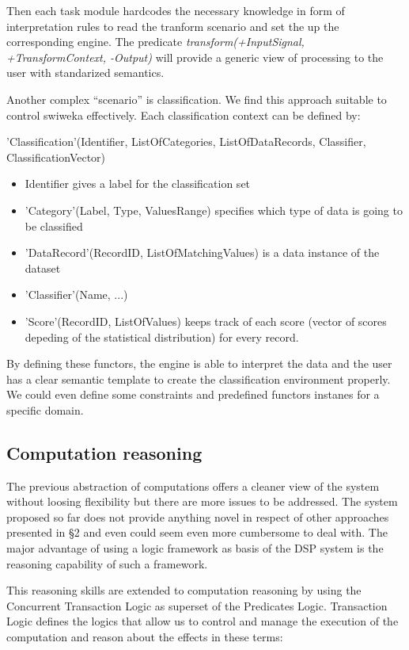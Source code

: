 \documentclass[runningheads]{llncs}
\begin{document}
Then each task module hardcodes the necessary knowledge in form of interpretation rules to read the tranform scenario and set the up the corresponding engine. The predicate \textit{transform(+InputSignal, +TransformContext, -Output)} will provide a generic view of processing to the user with standarized semantics.

Another complex ``scenario'' is classification. We find this approach suitable to control swiweka effectively. Each classification context can be defined by:

'Classification'(Identifier, ListOfCategories, ListOfDataRecords, Classifier, ClassificationVector)

\begin{itemize}

 \item Identifier gives a label for the classification set
 \item 'Category'(Label, Type, ValuesRange) specifies which type of data is going to be classified
 \item 'DataRecord'(RecordID, ListOfMatchingValues) is a data instance of the dataset 
 \item 'Classifier'(Name, ...)
 \item 'Score'(RecordID, ListOfValues) keeps track of each score (vector of scores depeding of the statistical distribution) for every record.
\end{itemize}

By defining these functors, the engine is able to interpret the data and the user has a clear semantic template to create the classification environment properly. We could even define some constraints and predefined functors instanes for a specific domain.

\subsection{Computation reasoning}\label{subsec:ctl}

The previous abstraction of computations offers a cleaner view of the system without loosing flexibility but there are more issues to be addressed. The system proposed so far does not provide anything novel in respect of other approaches presented in \S 2 and even could seem even more cumbersome to deal with. The major advantage of using a logic framework as basis of the DSP system is the reasoning capability of such a framework. 

This reasoning skills are extended to computation reasoning by using the Concurrent Transaction Logic as superset of the Predicates Logic. Transaction Logic defines the logics that allow us to control and manage the execution of the computation and reason about the effects in these terms:
\end{document}
